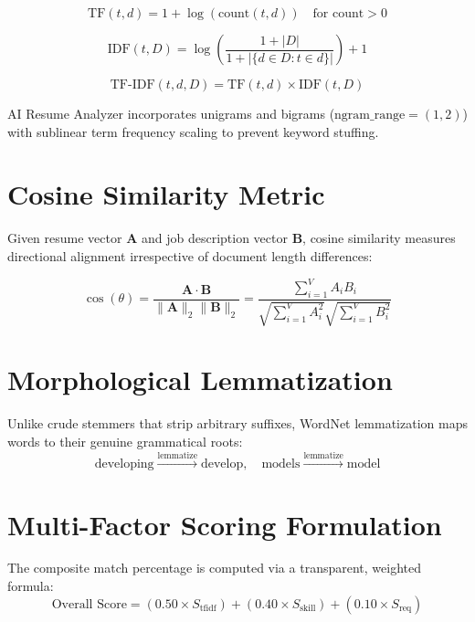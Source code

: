 \documentclass[12pt,a4paper]{report}
\begin{document}
\begin{equation}
\text{TF}(t, d) = 1 + \log(\text{count}(t, d)) \quad \text{for count} > 0
\end{equation}

\begin{equation}
\text{IDF}(t, D) = \log\left(\frac{1 + |D|}{1 + |\{d \in D : t \in d\}|}\right) + 1
\end{equation}

\begin{equation}
\text{TF-IDF}(t, d, D) = \text{TF}(t, d) \times \text{IDF}(t, D)
\end{equation}

AI Resume Analyzer incorporates unigrams and bigrams ($\text{ngram\_range} = (1, 2)$) with sublinear term frequency scaling to prevent keyword stuffing.

\section{Cosine Similarity Metric}
Given resume vector $\mathbf{A}$ and job description vector $\mathbf{B}$, cosine similarity measures directional alignment irrespective of document length differences:

\begin{equation}
\cos(\theta) = \frac{\mathbf{A} \cdot \mathbf{B}}{\|\mathbf{A}\|_2 \|\mathbf{B}\|_2} = \frac{\sum_{i=1}^V A_i B_i}{\sqrt{\sum_{i=1}^V A_i^2} \sqrt{\sum_{i=1}^V B_i^2}}
\end{equation}

\section{Morphological Lemmatization}
Unlike crude stemmers that strip arbitrary suffixes, WordNet lemmatization maps words to their genuine grammatical roots:
\begin{equation*}
\text{developing} \xrightarrow{\text{lemmatize}} \text{develop}, \quad \text{models} \xrightarrow{\text{lemmatize}} \text{model}
\end{equation*}

\section{Multi-Factor Scoring Formulation}
The composite match percentage is computed via a transparent, weighted formula:
\begin{equation}
\text{Overall Score} = (0.50 \times S_{\text{tfidf}}) + (0.40 \times S_{\text{skill}}) + (0.10 \times S_{\text{req}})
\end{equation}
\end{document}
